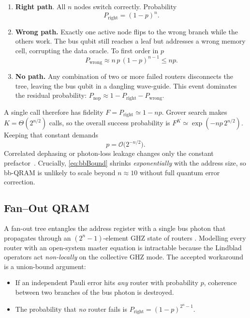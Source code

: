 \documentclass[11pt]{article}
\begin{document}
\begin{enumerate}
\item \textbf{Right path}.  
  All \(n\) nodes switch correctly.  
  Probability
  \[
     P_{\mathrm{right}}=(1-p)^{n}.
  \]

\item \textbf{Wrong path.}  
  Exactly one active node flips to the wrong
  branch while the others work.  
  The bus qubit still reaches a leaf but
  addresses a wrong memory cell, corrupting the data oracle.
  To first order in \(p\)
  \[
     P_{\mathrm{wrong}}\approx n\,p\,(1-p)^{n-1}\le np .
  \]

\item \textbf{No path.}  
  Any combination of two or more failed routers
  disconnects the tree, leaving the bus qubit in a dangling wave-guide.
  This event dominates the residual probability:
  \(P_{\mathrm{nop}}\approx 1-P_{\mathrm{right}}-P_{\mathrm{wrong}}\).
\end{enumerate}

A single call therefore has fidelity
\(F=P_{\mathrm{right}}\simeq 1-np\).
Grover search makes
\(K=\Theta(2^{n/2})\) calls, so the overall success probability is
\(F^{K}\simeq\exp(-np\,2^{n/2})\).
Keeping that constant demands
\begin{equation}
   p = \mathcal{O}\!\bigl(2^{-n/2}\bigr).
   \label{eq:bbBound}
\end{equation}
Correlated dephasing or photon-loss leakage changes only the constant
prefactor~\cite{Robust2024}.  
Crucially, \eqref{eq:bbBound} shrinks \emph{exponentially} with the
address size, so bb-QRAM is unlikely to scale beyond \(n\approx10\)
without full quantum error correction.



\subsection{Fan--Out QRAM}
\label{ssec:fanout}

A fan-out tree entangles the address register with a single bus photon
that propagates through an \((2^{n}-1)\)-element GHZ state of routers
\cite{Giovannetti2008}.  
Modelling every router with an open-system master equation is intractable
because the Lindblad operators act \emph{non-locally} on the collective
GHZ mode.
The accepted workaround is a union-bound argument:

\begin{itemize}
\item If an independent Pauli error hits \emph{any} router with
      probability \(p\), coherence between two branches of the bus
      photon is destroyed.
\item The probability that \emph{no} router fails is
      \(P_{\mathrm{right}}=(1-p)^{2^{n}-1}\).
\end{itemize}
\end{document}
